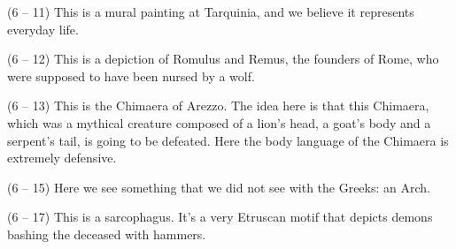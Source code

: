 \documentclass{article}
\begin{document}
\begin{spacing}{1.2}
        (6 -- 11) This is a mural painting at Tarquinia, and we believe it represents everyday life.

        (6 -- 12) This is a depiction of Romulus and Remus, the founders of Rome, who were supposed to have been nursed by a wolf.

        (6 -- 13) This is the Chimaera of Arezzo. The idea here is that this Chimaera, which was a mythical creature composed of a lion's head, a goat's body and a serpent's tail, is going to be defeated. Here the body language of the Chimaera is extremely defensive.

        (6 -- 15) Here we see something that we did not see with the Greeks: an Arch.

        (6 -- 17) This is a sarcophagus. It's a very Etruscan motif that depicts demons bashing the deceased with hammers. 
    \end{spacing}
\end{document}

